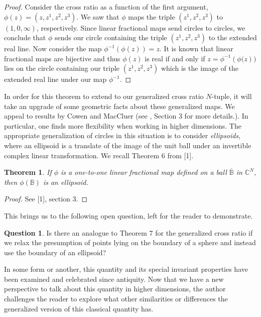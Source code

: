 \documentclass{amsart}
\theoremstyle{theorem}
\newtheorem{theorem}{Theorem}
\theoremstyle{lemma}
\theoremstyle{definition}
\newtheorem*{question}{Question}
\begin{document}
\begin{proof}
Consider the cross ratio as a function of the first argument, $\phi(z)=(z,z^1,z^2,z^3)$. We saw that $\phi$ maps the triple $(z^1,z^2,z^3)$ to $(1,0,\infty)$, respectively. Since linear fractional maps send circles to circles, we conclude that $\phi$ sends our circle containing the triple $(z^1, z^2, z^3)$ to the extended real line. Now consider the map $\phi^{-1} \left(\phi (z)\right)=z$. It is known that linear fractional maps are bijective and thus $\phi(z)$ is real if and only if $z=\phi^{-1}\left( \phi(z\right))$ lies on the circle containing our triple $(z^1, z^2, z^3)$ which is the image of the extended real line under our map $\phi^{-1}$. 
\end{proof}

In order for this theorem to extend to our generalized cross ratio $N$-tuple, it will take an upgrade of some geometric facts about these generalized maps. We appeal to results by Cowen and MacCluer (see \cite{Cowen}, Section 3 for more details.). In particular, one finds more flexibility when working in higher dimensions. The appropriate generalization of circles in this situation is to consider {\it ellipsoids}, where an ellipsoid is a translate of the image of the unit ball under an invertible complex linear transformation. We recall Theorem $6$ from [1].

\begin{theorem}
If $\phi$ is a one-to-one linear fractional map defined on a ball $\overline{\mathbb{B}}$ in $\mathbb{C}^N$, then $\phi (\mathbb{B})$ is an ellipsoid.
\end{theorem}

\begin{proof}
See [1], section $3$.
\end{proof}

This brings us to the following open question, left for the reader to demonstrate.

\begin{question}
Is there an analogue to Theorem $7$ for the generalized cross ratio if we relax the presumption of points lying on the boundary of a sphere and instead use the boundary of an ellipsoid?
\end{question}

In some form or another, this quantity and its special invariant properties have been examined and celebrated since antiquity. Now that we have a new perspective to talk about this quantity in higher dimensions, the author challenges the reader to explore what other similarities or differences the generalized version of this classical quantity has. 
\end{document}
